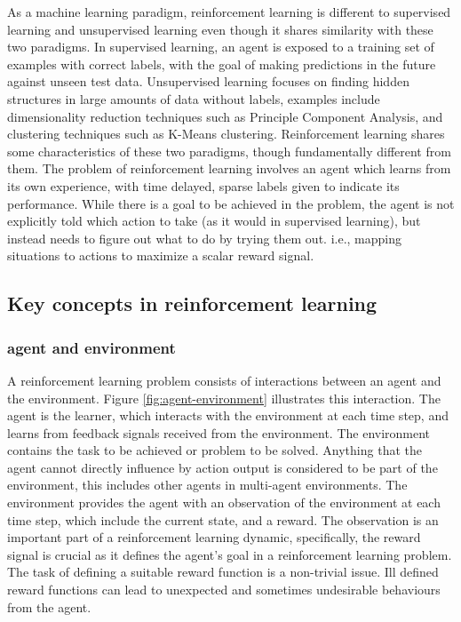 As a machine learning paradigm, reinforcement learning is different to supervised learning and unsupervised learning even though it shares similarity with these two paradigms. In supervised learning, an agent is exposed to a training set of examples with correct labels, with the goal of making predictions in the future against unseen test data. Unsupervised learning focuses on finding hidden structures in large amounts of data without labels, examples include dimensionality reduction techniques such as Principle Component Analysis, and clustering techniques such as K-Means clustering. Reinforcement learning shares some characteristics of these two paradigms, though fundamentally different from them. The problem of reinforcement learning involves an agent which learns from its own experience, with time delayed, sparse labels given to indicate its performance. While there is a goal to be achieved in the problem, the agent is not explicitly told which action to take (as it would in supervised learning), but instead needs to figure out what to do by trying them out. i.e., mapping situations to actions to maximize a scalar reward signal. 

\subsection{Key concepts in reinforcement learning}

\subsubsection{agent and environment}

A reinforcement learning problem consists of interactions between an agent and the environment. Figure \ref{fig:agent-environment} illustrates this interaction. The agent is the learner, which interacts with the environment at each time step, and learns from feedback signals received from the environment. The environment contains the task to be achieved or problem to be solved. Anything that the agent cannot directly influence by action output is considered to be part of the environment, this includes other agents in multi-agent environments. The environment provides the agent with an observation of the environment at each time step, which include the current state, and a reward. The observation is an important part of a reinforcement learning dynamic, specifically, the reward signal is crucial as it defines the agent's goal in a reinforcement learning problem. The task of defining a suitable reward function is a non-trivial issue. Ill defined reward functions can lead to unexpected and sometimes undesirable behaviours from the agent. 

